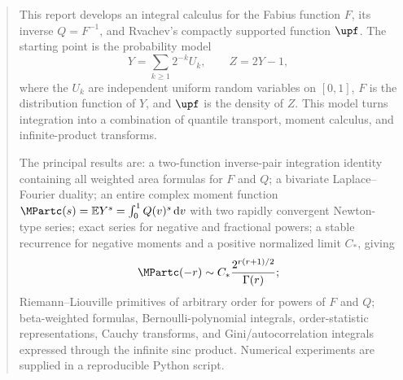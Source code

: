 \documentclass[11pt,oneside]{article}
\theoremstyle{definition}
\theoremstyle{remark}
\newcommand{\F}{F}
\newcommand{\Q}{Q}
\newcommand{\E}{\mathbb E}
\newcommand{\dd}{\,\mathrm d}
\newcommand{\1}{\mathbf 1}
\begin{document}
\begin{abstract}
This report develops an integral calculus for the Fabius function \(\F\), its inverse
\(\Q=\F^{-1}\), and Rvachev's compactly supported function \(\upf\).  The starting
point is the probability model
\[
  Y=\sum_{k\ge1}2^{-k}U_k,\qquad Z=2Y-1,
\]
where the \(U_k\) are independent uniform random variables on \([0,1]\), \(\F\) is
the distribution function of \(Y\), and \(\upf\) is the density of \(Z\).  This model
turns integration into a combination of quantile transport, moment calculus, and
infinite-product transforms.

The principal results are: a two-function inverse-pair integration identity containing
all weighted area formulas for \(\F\) and \(\Q\); a bivariate Laplace--Fourier duality;
an entire complex moment function \(\MPartc(s)=\E Y^s=\int_0^1\Q(v)^s\dd v\) with two
rapidly convergent Newton-type series; exact series for negative and fractional powers;
a stable recurrence for negative moments and a positive normalized limit
\(C_*\), giving
\[
  \MPartc(-r)\sim C_*\frac{2^{r(r+1)/2}}{\Gamma(r)};
\]
Riemann--Liouville primitives of arbitrary order for powers of \(\F\) and \(\Q\);
beta-weighted formulas, Bernoulli-polynomial integrals, order-statistic representations,
Cauchy transforms, and Gini/autocorrelation integrals expressed through the infinite
sinc product.  Numerical experiments are supplied in a reproducible Python script.


\end{abstract}
\end{document}
